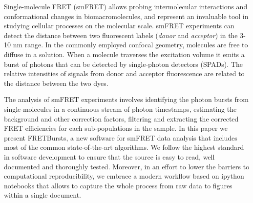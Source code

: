 Single-molecule FRET (smFRET) allows probing intermolecular interactions and conformational changes in biomacromolecules, and represent an invaluable tool in studying cellular processes on the molecular scale\cite{Kapanidis_2006}. smFRET experiments can detect the distance between two fluorescent labels (\textit{donor} and \textit{acceptor}) in the 3-10 nm range. In the commonly employed confocal geometry, molecules are free to diffuse in a solution. When a molecule traverses the excitation volume it emits a burst of photons that can be detected by single-photon detectors (SPADs). 
The relative intensities of signals from donor and acceptor fluorescence are related to the distance between the two dyes.

The analysis of smFRET experiments involves identifying the photon bursts from single-molecules in a continuous stream of photon timestamps, estimating the background and other correction factors, filtering and extracting the corrected FRET efficiencies for each sub-populations in the sample. In this paper we present FRETBursts, a new software for smFRET data analysis that includes most of the common state-of-the-art algorithms. We follow the highest standard in software development to ensure that the source is easy to read, well documented and thoroughly tested. Moreover, in an effort to lower the barriers to computational reproducibility, we embrace a modern workflow based on ipython notebooks that allows to capture the whole process from raw data to figures within a single document.
